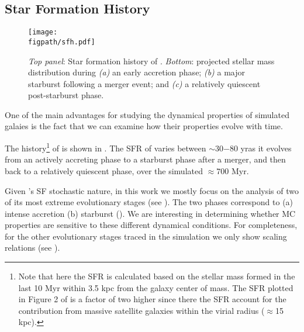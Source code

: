 \IfFileExists{emulateapjlegacy.cls}{\documentclass[iop]{emulateapjlegacy}}{\documentclass[iop]{emulateapj}}
\def\figpath{./Fig}
\begin{document}
\subsection{Star Formation History} \label{sec:sfh}

\begin{figure*}
\centering
\texttt{[image: \\figpath/sfh.pdf]}
\caption{
    {\it Top panel}: Star formation history of \flower. {\it Bottom}: projected stellar mass distribution during {\it (a)} an early accretion phase;  {\it (b)} a major starburst following a merger event; and {\it (c)} a relatively quiescent post-starburst phase.
\label{fig:SFH}}
\end{figure*}

One of the main advantages for studying the dynamical properties of simulated galaies is the fact that we can examine how their properties evolve with time.
%

The \SF history\footnote{Note that here the SFR is calculated based on the stellar mass formed in the last 10 Myr within 3.5 kpc from the galaxy center of mass. The SFR plotted in Figure 2 of \citet{Pallottini17b} is a factor of two higher since there the SFR account for the contribution from massive satellite galaxies within the virial radius ($\approx$15\,kpc).} of \flower is shown in . The SFR of \flower varies between $\sim$30$-$80\,\Msun\,yr\pmOne as it evolves from an actively accreting phase to a starburst phase after a merger, and then back to a relatively quiescent phase, over the simulated $\approx 700$ Myr.

Given \flower's SF stochastic nature, in this work we mostly focus on the analysis of two of its most extreme evolutionary stages (see ). The two phases correspond to (a) intense accretion (b) starburst (). We are interesting in determining whether MC properties are sensitive to these different dynamical conditions. For completeness, for the other evolutionary stages traced in the simulation we only show scaling relations (see ).
\end{document}
